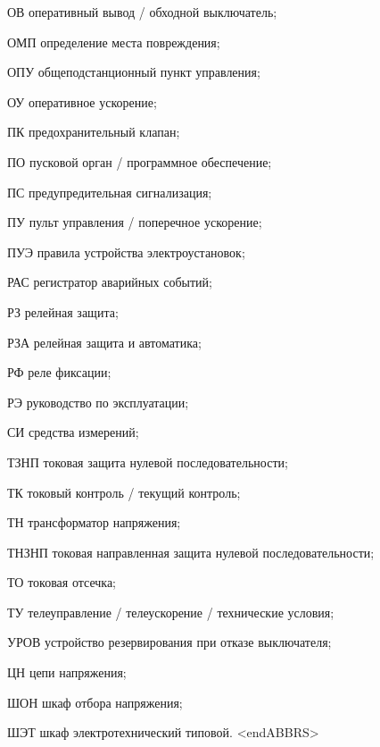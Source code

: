 \begin{list}{}
\item[ОВ] оперативный вывод / обходной выключатель;
\item[ОМП] определение места повреждения;
\item[ОПУ] общеподстанционный пункт управления;
\item[ОУ] оперативное ускорение;
\item[ПК] предохранительный клапан;
\item[ПО] пусковой орган / программное обеспечение;
\item[ПС] предупредительная сигнализация;
\item[ПУ] пульт управления / поперечное ускорение;
\item[ПУЭ] правила устройства электроустановок;
\item[РАС] регистратор аварийных событий;
\item[РЗ] релейная защита;
\item[РЗА] релейная защита и автоматика;
\item[РФ] реле фиксации;
\item[РЭ] руководство по эксплуатации;
\item[СИ] средства измерений;
\item[ТЗНП] токовая защита нулевой последовательности;
\item[ТК] токовый контроль / текущий контроль;
\item[ТН] трансформатор напряжения;
\item[ТНЗНП] токовая направленная защита нулевой последовательности;
\item[ТО] токовая отсечка;
\item[ТУ] телеуправление / телеускорение / технические условия;
\item[УРОВ] устройство резервирования при отказе выключателя;
\item[ЦН] цепи напряжения;
\item[ШОН] шкаф отбора напряжения;
\item[ШЭТ] шкаф электротехнический типовой.
{\color{white}\fontsize{0.1pt}{0.1pt}\selectfont<endABBRS>}
\end{list}
